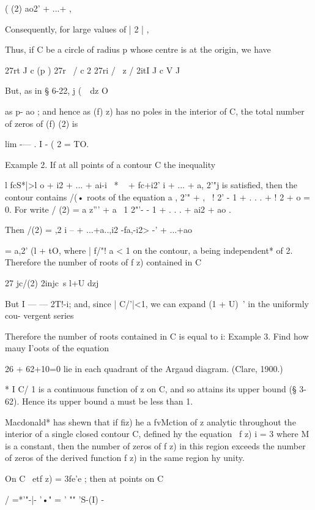 ( (2) ao2' + ...+ ,

Consequently, for large values of | 2 | ,

Thus, if C be a circle of radius p whose centre is at the origin, we
have

27rt J c (p ) 27r \ / c 2 27ri / \ z / 2itI J c V J

But, as in § 6-22, j (\ \ dz O

as p- ao ; and hence as (f) z) has no poles in the interior of C, the
total number of zeros of (f) (2) is

lim -— . I - ( 2 = TO.

Example 2. If at all points of a contour C the inequality

l fcS*|>l o + i2 + ... + ai-i~ * ~ + fc+i2' i + ... + a, 2'"j is
satisfied, then the contour contains /(• roots of the equation a , 2'"
+ , \ ! 2' - 1 + . . . + ! 2 + o = 0. For write / (2) = a z''' + a \ 1
2"'- - 1 + . . . + ai2 + ao .

Then /(2) = ,2 i -- + ...+a..,i2 -fa,-i2> -' + ...+ao\

= a,2' (l + tO, where | f/"! a < 1 on the contour, a being
independent* of 2. Therefore the number of roots of f z) contained in
C

27 jc/(2) 2injc\ s l+U dzj

But I — — 2T!-i; and, since | C/'|<1, we can expand (1 + U)~' in the
uniformly cou- vergent series

Therefore the number of roots contained in C is equal to i: Example 3.
Find how mauy I'oots of the equation

26 + 62+10=0 lie in each quadrant of the Argaud diagram. (Clare,
1900.)

* I C/ 1 is a continuous function of z on C, and so attains its upper
bound (§ 3-62). Hence its upper bound a must be less than 1.

%
%


Macdonald* has shewn that if fiz) he a fvMction of z analytic
throughout the interior of a single closed contour C, defined hy the
equation \ f z) i = 3 where M is a constant, then the number of zeros
of f z) in this region exceeds the number of zeros of the derived
function f z) in the same region hy unity.

On C \ etf z) = 3fe'e ; then at points on C

/ =*'"-|- '•" = ' "" 'S-(I) -

